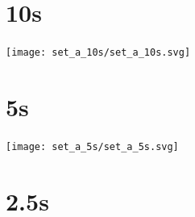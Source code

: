 \documentclass{article}
\begin{document}
\belowcaptionskip=-10pt


\section{10s}
    \noindent\begin{minipage}{.45\textwidth}
    
    \end{minipage}\hfill
    \begin{minipage}{.45\textwidth}
    
    \end{minipage}
    
    \begin{center}
    \texttt{[image: set\_a\_10s/set\_a\_10s.svg]}
    \end{center}
\clearpage

\section{5s}
    \noindent\begin{minipage}{.45\textwidth}
    
    \end{minipage}\hfill
    \begin{minipage}{.45\textwidth}
    
    \end{minipage}
    
    \begin{center}
    \texttt{[image: set\_a\_5s/set\_a\_5s.svg]}
    \end{center}
\clearpage

\section{2.5s}
    \noindent\begin{minipage}{.45\textwidth}
    
    \end{minipage}\hfill
    \begin{minipage}{.45\textwidth}
    
    \end{minipage}
    
\end{document}
